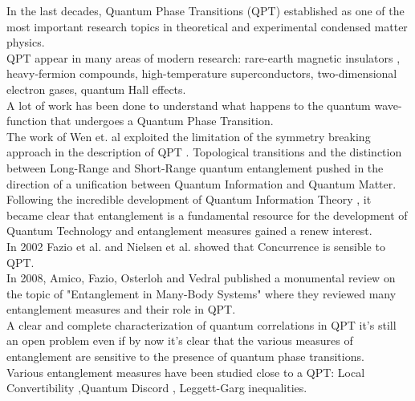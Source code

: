 \documentclass[12pt,a4paper]{book}
\theoremstyle{definition}
\begin{document}
In the last decades, Quantum Phase Transitions (QPT) \cite{sachdev_2011} \cite{Vojta_2003}  established as one of the most important research topics in theoretical and experimental \cite{Baumann2010} condensed matter physics. \\
QPT appear in many areas of modern research: rare-earth magnetic insulators , heavy-fermion
compounds, high-temperature superconductors, two-dimensional
electron gases,  quantum Hall effects.\\
A lot of work has been done to understand what happens to the quantum wave-function that undergoes a Quantum Phase Transition.\\
The work of Wen et. al exploited the limitation of the symmetry breaking approach in the description of QPT  \cite{Xiao:803748}. Topological transitions and the distinction between Long-Range and Short-Range quantum entanglement pushed in the direction of a unification between Quantum Information and Quantum Matter. \cite{Zeng2019}\\
Following the incredible development of Quantum Information Theory  \cite{NielsChuang} \cite{wilde_2013}, it became clear that entanglement is a fundamental resource for the development of  Quantum Technology and entanglement measures gained a renew interest.\\ 
In 2002 \cite{Osterloh2002} Fazio et al. and  \cite{PhysRevA.66.032110} Nielsen et al. showed that Concurrence is sensible to QPT. \\
In 2008, Amico, Fazio, Osterloh and Vedral published a monumental review \cite{RevModPhys.80.517} on the topic of "Entanglement in Many-Body Systems" where they reviewed many entanglement measures and their role in QPT.  \\
A clear and complete characterization of quantum correlations in QPT it's still  an open problem \cite{De_Chiara_2018} even if by now it's clear that the various measures of entanglement
are sensitive to the presence of quantum
phase transitions. \cite{PhysRevLett.93.250404} \\ 
Various entanglement measures have been studied close to a QPT:
  Local Convertibility \cite{Franchini_2014},Quantum Discord \cite{Tomasello_2011}, Leggett-Garg
  inequalities\cite{PhysRevB.93.035441}. \\ 
 
\end{document}
